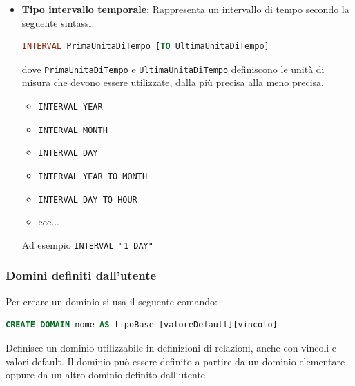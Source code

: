 \documentclass[a4paper]{article}
\begin{document}
\begin{itemize}
\begin{itemize}
      \item 
\begin{lstlisting}[language=SQL, numbers=none]
TIMESTAMP [(precisione)][WITH TIME ZONE]
\end{lstlisting}
Equivale a \texttt{DATE} + \texttt{TIME}.
    \end{itemize}

  \item \textbf{Tipo intervallo temporale}:
    Rappresenta un intervallo di tempo secondo la seguente sintassi:
\begin{lstlisting}[language=SQL, numbers=none]
INTERVAL PrimaUnitaDiTempo [TO UltimaUnitaDiTempo]
\end{lstlisting}
    dove \texttt{PrimaUnitaDiTempo} e \texttt{UltimaUnitaDiTempo} definiscono le
    unità di misura che devono essere utilizzate, dalla più precisa alla meno precisa.
    \begin{itemize}
      \item \texttt{INTERVAL YEAR}
      \item \texttt{INTERVAL MONTH}
      \item \texttt{INTERVAL DAY}
      \item \texttt{INTERVAL YEAR TO MONTH}
      \item \texttt{INTERVAL DAY TO HOUR}
      \item ecc...
    \end{itemize}
    Ad esempio \texttt{INTERVAL "1 DAY"}
\end{itemize}

\subsubsection{Domini definiti dall'utente}
Per creare un dominio si usa il seguente comando:
\begin{lstlisting}[language=SQL]
CREATE DOMAIN nome AS tipoBase [valoreDefault][vincolo]
\end{lstlisting}
Definisce un dominio utilizzabile in definizioni di relazioni, anche con vincoli
e valori default.
Il dominio può essere definito a partire da un dominio elementare oppure da un altro
dominio definito dall‘utente

\vspace{2em}
\noindent
\end{document}
